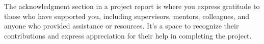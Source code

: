The acknowledgment section in a project report is where you express
gratitude to those who have supported you, including supervisors,
mentors, colleagues, and anyone who provided assistance or
resources. It's a space to recognize their contributions and express
appreciation for their help in completing the project.